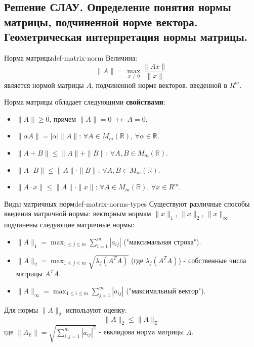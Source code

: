 \documentclass[14pt]{extarticle}
\begin{document}
\clearpage
\subsection{Решение СЛАУ. Определение понятия нормы матрицы, подчиненной норме вектора. Геометрическая интерпретация нормы матрицы.}

    \begin{definition}{Норма матрицы}{def-matrix-norm}
        Величина:
        $$\|A\| = \max_{x \neq 0} \frac{\|Ax\|}{\|x\|}$$
        является нормой матрицы $A$, подчиненной норме векторов, введенной в $R^{m}$.

        \vspace{\baselineskip}

        Норма матрицы обладает следующими \textbf{свойствами}:
        \begin{itemize}
            \item $\|A\| \geq 0$, причем $\|A\| = 0$ $\leftrightarrow$ $A = 0$.
            \item $\|\alpha A\| = |\alpha| \|A\|$: $\forall A \in M_{m}(\mathbb{R})$, $\forall \alpha \in \mathbb{R}$.
            \item $\|A + B\| \leq \|A\| + \|B\|$: $\forall A, B \in M_{m}(\mathbb{R})$.
            \item $\|A \cdot B\| \leq \|A\| \cdot \|B\|$: $\forall A, B \in M_{m}(\mathbb{R})$.
            \item $\|A \cdot x\| \leq \|A\| \cdot \|x\|$: $\forall A \in M_{m}(\mathbb{R})$, $\forall x \in R^{m}$.
        \end{itemize}
    \end{definition}

    \begin{definition}{Виды матричных норм}{def-matrix-norms-types}
        Существуют различные способы введения матричной нормы: векторным нормам $\|x\|_{1}$, $\|x\|_{2}$, $\|x\|_{\infty}$ подчинены следующие матричные нормы:
            \begin{itemize}
                \item $\|A\|_{1} = \max_{1 \leq j \leq m} \sum_{i=1}^{m} |a_{ij}|$ ("максимальная строка").
                \item $\|A\|_{2} = \max_{1 \leq j \leq m} \sqrt{\lambda_{j}(A^{T}A)}$ (где $\lambda_{j}(A^{T}A)$) - собственные числа матрицы $A^{T}A$.
                \item $\|A\|_{\infty} = \max_{1 \leq i \leq m} \sum_{j=1}^{m} |a_{ij}|$ ("максимальный вектор").
            \end{itemize}

        \vspace{\baselineskip}

        Для нормы $\|A\|_{2}$ используют оценку:
        $$\|A\|_{2} \leq \|A\|_{\text{Е}}$$
        где $\|A_{\text{Е}}\| = \sqrt{\sum_{i, j = 1}^{m} |a_{ij}|^{2}}$ - евклидова норма матрицы $A$.
    \end{definition}
\end{document}
